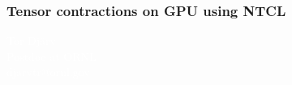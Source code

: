 \frametitle{Tensor contractions on GPU using NTCL}
\begin{minipage}{0.45\textwidth}
\textcolor{white}{
Tor Djärv\\
Postdoc at ORNL\\
djarvtr@ornl.gov
}
\end{minipage}
